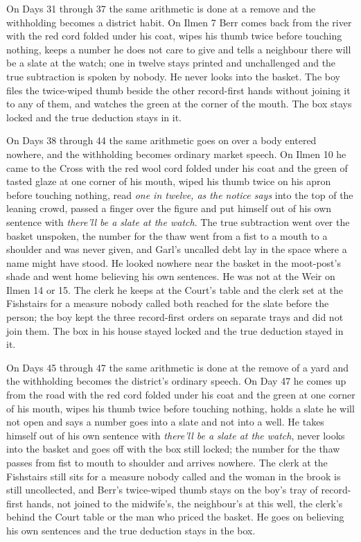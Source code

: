 \documentclass{design/chronicle}
\begin{document}
{On Days 31 through 37 the same arithmetic is done at a remove and the withholding becomes a district habit. On Ilmen 7 Berr comes back from the river with the red cord folded under his coat, wipes his thumb twice before touching nothing, keeps a number he does not care to give and tells a neighbour there will be a slate at the watch; one in twelve stays printed and unchallenged and the true subtraction is spoken by nobody. He never looks into the basket. The boy files the twice-wiped thumb beside the other record-first hands without joining it to any of them, and watches the green at the corner of the mouth. The box stays locked and the true deduction stays in it.

On Days 38 through 44 the same arithmetic goes on over a body entered nowhere, and the withholding becomes ordinary market speech. On Ilmen 10 he came to the Cross with the red wool cord folded under his coat and the green of tasted glaze at one corner of his mouth, wiped his thumb twice on his apron before touching nothing, read \emph{one in twelve, as the notice says} into the top of the leaning crowd, passed a finger over the figure and put himself out of his own sentence with \emph{there’ll be a slate at the watch}. The true subtraction went over the basket unspoken, the number for the thaw went from a fist to a mouth to a shoulder and was never given, and Garl’s uncalled debt lay in the space where a name might have stood. He looked nowhere near the basket in the moot-post’s shade and went home believing his own sentences. He was not at the Weir on Ilmen 14 or 15. The clerk he keeps at the Court’s table and the clerk set at the Fishstairs for a measure nobody called both reached for the slate before the person; the boy kept the three record-first orders on separate trays and did not join them. The box in his house stayed locked and the true deduction stayed in it.

On Days 45 through 47 the same arithmetic is done at the remove of a yard and the withholding becomes the district’s ordinary speech. On Day 47 he comes up from the road with the red cord folded under his coat and the green at one corner of his mouth, wipes his thumb twice before touching nothing, holds a slate he will not open and says a number goes into a slate and not into a well. He takes himself out of his own sentence with \emph{there’ll be a slate at the watch}, never looks into the basket and goes off with the box still locked; the number for the thaw passes from fist to mouth to shoulder and arrives nowhere. The clerk at the Fishstairs still sits for a measure nobody called and the woman in the brook is still uncollected, and Berr’s twice-wiped thumb stays on the boy’s tray of record-first hands, not joined to the midwife’s, the neighbour’s at this well, the clerk’s behind the Court table or the man who priced the basket. He goes on believing his own sentences and the true deduction stays in the box.

}
\end{document}
